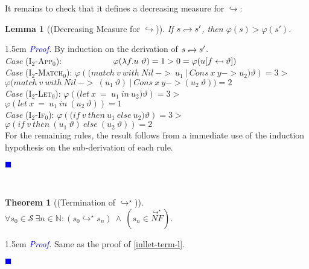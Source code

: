 \documentclass[a4paper,11pt,oneside]{article}
\theoremstyle{plain}
\newtheorem{lemma}[definition]{Lemma}
\newtheorem{theorem}[definition]{Theorem}
\renewenvironment{proof}{\noindent \begin{adjustwidth}{1.5em}{} \textcolor{blue}{\textit{Proof.}}}
{{\begin{tiny}\textcolor{blue}{$\blacksquare$}\end{tiny}}
\end{adjustwidth}~\\\noindent}
\newcommand{\bwedge}{\boldsymbol{~\wedge~}}
\newcommand{\inlS}{\mathcal{S}}
\newcommand{\hookdownarrow}{\mathrel{\rotatebox[origin=c]{180}{$\hookleftarrow$}}}
\newcommand{\inlletarr}{\hookdownarrow}
\newcommand{\ilarr}{\hookdownarrow}
\newcommand{\il}[2]{#1 \ilarr #2}
\newcommand{\icarr}{\hookrightarrow}
\newcommand{\icarrt}{\icarr^{\star}}
\newcommand{\icNF}{\overset{\icarrt}{NF}}
\newcommand{\ic}[2]{#1 \icarr #2}
\newcommand{\ict}[2]{#1 \icarrt #2}
\begin{document}
It remains to check that it defines a decreasing measure for $\icarr$:
	\begin{lemma}[(Decreasing Measure for $\icarr$)] 
If $\il{s}{s'}$, then $\varphi(s) > \varphi(s')$.
\hypertarget{desc-meas-1}{}
\end{lemma}
\begin{proof}
By induction on the derivation of $\il{s}{s'}$. \\

\noindent\textit{Case} (\textsc{I}$_{2}$-\textsc{App}$_0$):
$\hspace*{2cm} \varphi(\lambda f. u~\vartheta) = 1 > 0 = \varphi(u [f \mapsfrom \vartheta])$\\

\noindent\textit{Case} (\textsc{I}$_{2}$-\textsc{Match}$_0$): 
\hspace*{2em} 
$\varphi(\boldsymbol{(}match~v~with~Nil~->~u_1~|~Cons~x~y -> u_2{)} \vartheta) = 3 >$\\
\hspace*{10em} 
$	\varphi(match~v~with~Nil~->~(u_1~\vartheta)~|~Cons~x~y -> (u_2~\vartheta){)} = 2$\\

\noindent\textit{Case} (\textsc{I}$_{2}$-\textsc{Let}$_0$): 
\hspace*{2em} 
$\varphi(\boldsymbol{(}let~x~=~u_1~in~u_2{)} \vartheta) = 3 > $\\
\hspace*{8em} 
$\varphi(let~x~=~u_1~in~(u_2~\vartheta)) = 1$\\

\noindent\textit{Case} (\textsc{I}$_{2}$-\textsc{If}$_0$): 
\hspace*{2em} 
$\varphi(\boldsymbol{(}if~v~then~u_1~else~u_2{)} \vartheta) = 3 > $\\
\hspace*{7em} 
$\varphi(if~v~then~(u_1~\vartheta)~else~(u_2~\vartheta)) = 2$\\

For the remaining rules, the result follows from a immediate use of the induction hypothesis on the sub-derivation of each rule.
\end{proof}
\begin{theorem}[(Termination of $\icarrt$)] 
		$\forall s_0 \in \inlS~
	 			\exists n \in \mathbb{N}:  
	 				  (\ict{s_0}{s_n}) \bwedge (s_n \in \icNF).$
\label{ic-term-l}
\end{theorem}
\begin{proof}
Same as the proof of \cref{inllet-term-l}.
\end{proof}
\end{document}
